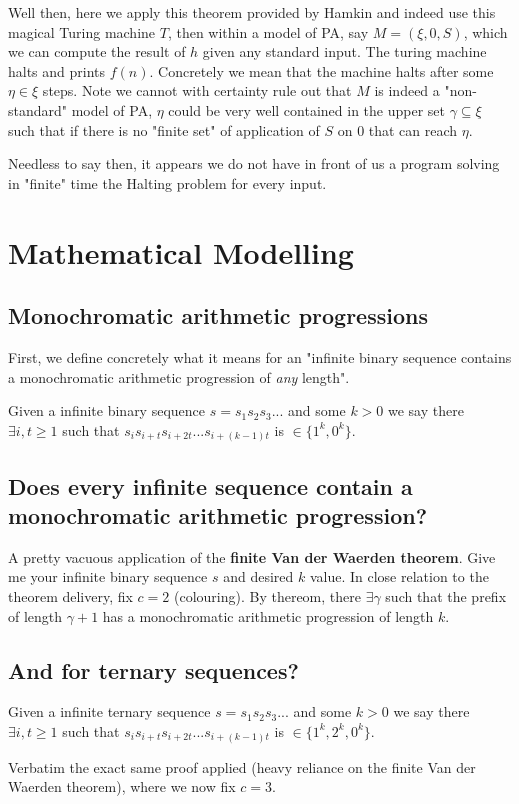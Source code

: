 \documentclass{article}
\begin{document}
Well then, here we apply this theorem provided by Hamkin and indeed use this magical Turing machine $T$, then within a model of PA, say $M = (\xi,0,S)$, which we can compute the result of $h$ given any standard input. The turing machine halts and prints $f(n)$. Concretely we mean that the machine halts after some $\eta \in \xi$ steps. Note we cannot with certainty rule out that $M$ is indeed a "non-standard" model of PA, $\eta$ could be very well contained in the upper set $\gamma \subseteq \xi$ such that if there is no "finite set" of application of $S$ on $0$ that can reach $\eta$.

Needless to say then, it appears we do not have in front of us a program solving in "finite" time the Halting problem for every input.

\pagebreak

\section{Mathematical Modelling}
\subsection{Monochromatic arithmetic progressions}
First, we define concretely what it means for an "infinite binary sequence contains a monochromatic arithmetic progression of \emph{any} length". 

Given a infinite binary sequence $s = s_{1}s_{2}s_{3}...$ and some $k>0$ we say there $\exists i,t \geq 1$ such that $s_{i}s_{i+t}s_{i+2t}...s_{i+(k-1)t}$ is $\in \{1^k,0^k\}$.

\subsection{Does every infinite sequence contain a monochromatic arithmetic progression?}
A pretty vacuous application of the \textbf{finite Van der Waerden theorem}. Give me your infinite binary sequence $s$ and desired $k$ value. In close relation to the theorem delivery, fix $c = 2$ (colouring). By thereom, there $\exists \gamma$ such that the prefix of length $\gamma + 1$ has a monochromatic arithmetic progression of length $k$.

\subsection{And for ternary sequences?} 
Given a infinite ternary sequence $s = s_{1}s_{2}s_{3}...$ and some $k>0$ we say there $\exists i,t \geq 1$ such that $s_{i}s_{i+t}s_{i+2t}...s_{i+(k-1)t}$ is $\in \{1^k,2^k,0^k\}$.

Verbatim the exact same proof applied (heavy reliance on the finite Van der Waerden theorem), where we now fix $c = 3$.
\end{document}
